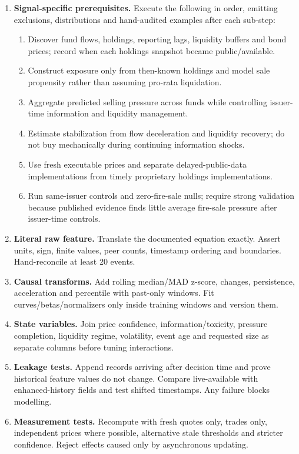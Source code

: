 \documentclass[10pt]{article}
\begin{document}
\begin{enumerate}[leftmargin=2em,label=\textbf{A\arabic*.}]
\item \textbf{Signal-specific prerequisites.} Execute the following in order, emitting exclusions, distributions and hand-audited examples after each sub-step:
\begin{enumerate}[label=\alph*)]
\item Discover fund flows, holdings, reporting lags, liquidity buffers and bond prices; record when each holdings snapshot became public/available.
\item Construct exposure only from then-known holdings and model sale propensity rather than assuming pro-rata liquidation.
\item Aggregate predicted selling pressure across funds while controlling issuer-time information and liquidity management.
\item Estimate stabilization from flow deceleration and liquidity recovery; do not buy mechanically during continuing information shocks.
\item Use fresh executable prices and separate delayed-public-data implementations from timely proprietary holdings implementations.
\item Run same-issuer controls and zero-fire-sale nulls; require strong validation because published evidence finds little average fire-sale pressure after issuer-time controls.
\end{enumerate}
\item \textbf{Literal raw feature.} Translate the documented equation exactly. Assert units, sign, finite values, peer counts, timestamp ordering and boundaries. Hand-reconcile at least 20 events.
\item \textbf{Causal transforms.} Add rolling median/MAD z-score, changes, persistence, acceleration and percentile with past-only windows. Fit curves/betas/normalizers only inside training windows and version them.
\item \textbf{State variables.} Join price confidence, information/toxicity, pressure completion, liquidity regime, volatility, event age and requested size as separate columns before tuning interactions.
\item \textbf{Leakage tests.} Append records arriving after decision time and prove historical feature values do not change. Compare live-available with enhanced-history fields and test shifted timestamps. Any failure blocks modelling.
\item \textbf{Measurement tests.} Recompute with fresh quotes only, trades only, independent prices where possible, alternative stale thresholds and stricter confidence. Reject effects caused only by asynchronous updating.

\end{enumerate}
\end{document}
